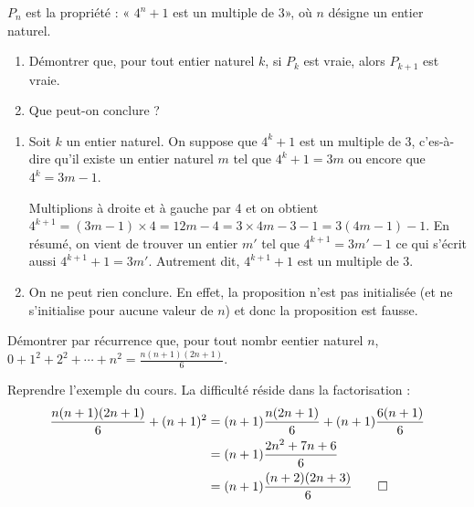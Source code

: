 \documentclass[12pt,a4paper,french]{article}
\begin{document}
\begin{question}
  $P_n$ est la propriété : « $4^n + 1 $ est un multiple de 3», où $n$
  désigne un entier naturel.
  \begin{enumerate}
    \item Démontrer que, pour tout entier naturel $k$, si $P_k$ est vraie,
      alors $P_{k+1}$ est vraie.
    \item Que peut-on conclure ?
  \end{enumerate}
\end{question}
\begin{solution}
  \begin{enumerate}
    \item
      Soit $k$ un entier naturel. On suppose que $4^k + 1$ est un multiple
      de 3, c'es-à-dire qu'il existe un entier naturel $m$ tel que $4^k + 1
      = 3m$ ou encore que $4^k = 3m - 1$.

      Multiplions à droite et à gauche par 4 et on obtient $4^{k+1} = (3m -
      1) \times 4 = 12m - 4 = 3\times 4m - 3 - 1 = 3(4m - 1) - 1$. En
      résumé, on vient de trouver un entier $m'$ tel que $4^{k+1} = 3m' - 1$
      ce qui s'écrit aussi $4^{k+1} + 1 = 3m'$. Autrement dit, $4^{k+1} +
      1$ est un multiple de 3.
    \item On ne peut rien conclure. En effet, la proposition n'est pas
      initialisée (et ne s'initialise pour aucune valeur de $n$) et donc la
      proposition est fausse.
  \end{enumerate}
\end{solution}

\begin{question}
  Démontrer par récurrence que, pour tout nombr eentier naturel $n$, $0 +
  1^2 + 2^2 + \cdots + n^2 = \frac{n(n+1)(2n+1)}6$.
\end{question}
\begin{solution}
  Reprendre l'exemple du cours. La difficulté réside dans la factorisation :
  \begin{align*}
    \frac{n(n+1)(2n+1)}6 + (n+1)^2 & = (n+1) \frac{n(2n+1)}6 + (n+1) \frac{6(n+1)}6 \\
                                   & = (n+1) \frac{2n^2 + 7n + 6}6 \\
                                   & = (n+1) \frac{(n+2)(2n+3)}6 \qed
  \end{align*}
\end{solution}
\end{document}
